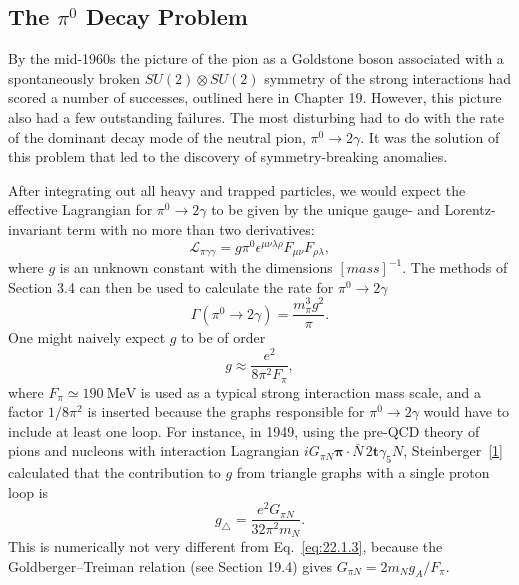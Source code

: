 \subsection{\texorpdfstring{The $\pi^0$ Decay Problem}{The pi0 Decay Problem}}
\label{sec:22.1}

By the mid-1960s the picture of the pion as a Goldstone boson associated
with a spontaneously broken $SU(2)\otimes SU(2)$ symmetry of the strong
interactions had scored a number of successes, outlined here in Chapter 19.
However, this picture also had a few outstanding failures. The most
disturbing had to do with the rate of the dominant decay mode of the neutral
pion, $\pi^0\to2\gamma$. It was the solution of this problem that led to the
discovery of symmetry-breaking anomalies.

After integrating out all heavy and trapped particles, we would expect the
effective Lagrangian for $\pi^0\to2\gamma$ to be given by the unique gauge-
and Lorentz-invariant term with no more than two derivatives:
\begin{equation}
 \mathcal L_{\pi\gamma\gamma}
 =g\pi^0\epsilon^{\mu\nu\lambda\rho}F_{\mu\nu}F_{\rho\lambda},
 \tag{22.1.1}\label{eq:22.1.1}
\end{equation}
where $g$ is an unknown constant with the dimensions $[\mathit{mass}]^{-1}$.
The methods of Section 3.4 can then be used to calculate the rate for
$\pi^0\to2\gamma$
\begin{equation}
 \Gamma(\pi^0\to2\gamma)=\frac{m_\pi^3g^2}{\pi}.
 \tag{22.1.2}\label{eq:22.1.2}
\end{equation}
One might naively expect $g$ to be of order
\begin{equation}
 g\approx\frac{e^2}{8\pi^2F_\pi},
 \tag{22.1.3}\label{eq:22.1.3}
\end{equation}
where $F_\pi\simeq190\ \mathrm{MeV}$ is used as a typical strong interaction
mass scale, and a factor $1/8\pi^2$ is inserted because the graphs
responsible for $\pi^0\to2\gamma$ would have to include at least one loop.
For instance, in 1949, using the pre-QCD theory of pions and nucleons with
interaction Lagrangian
$iG_{\pi N}\boldsymbol{\pi}\cdot\overline N\,2\mathbf{t}\gamma_5N$,
Steinberger~\hyperref[ch22-ref-1]{[1]} calculated that the contribution to
$g$ from triangle graphs with a single proton loop is
\begin{equation}
 g_\triangle=\frac{e^2G_{\pi N}}{32\pi^2m_N}.
 \tag{22.1.4}\label{eq:22.1.4}
\end{equation}
This is numerically not very different from Eq.~\eqref{eq:22.1.3}, because
the Goldberger--Treiman relation (see Section 19.4) gives
$G_{\pi N}=2m_Ng_A/F_\pi$.

